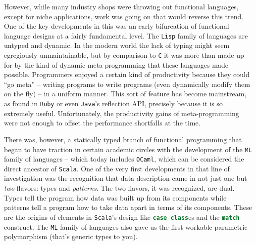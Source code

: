 However, while many industry shops were throwing out functional
languages, except for niche applications, work was going on that would
reverse this trend. One of the key developments in this was an early
bifurcation of functional language designs at a fairly fundamental
level. The \texttt{Lisp} family of languages are untyped and
dynamic. In the modern world the lack of typing might seem egregiously
unmaintainable, but by comparison to \texttt{C} it was more than made
up for by the kind of dynamic meta-programming that these languages
made possible. Programmers enjoyed a certain kind of productivity
because they could ``go meta'' -- writing programs to write programs
(even dynamically modify them on the fly) -- in a uniform manner. This
sort of feature has become mainstream, as found in \texttt{Ruby} or
even \texttt{Java}'s reflection API, precisely because it is so
extremely useful. Unfortunately, the productivity gains of
meta-programming were not enough to offset the performance shortfalls
at the time.

There was, however, a statically typed branch of functional
programming that began to have traction in certain academic circles
with the development of the \texttt{ML} family of languages -- which
today includes \texttt{OCaml}, which can be considered the direct
ancestor of \texttt{Scala}. One of the very first developments in that
line of investigation was the recognition that data description came
in not just one but \emph{two} flavors: types and \emph{patterns}. The
two flavors, it was recognized, are dual. Types tell the program how
data was built up from its components while patterns tell a program
how to take data apart in terms of its components. These are the
origins of elements in \texttt{Scala}'s design like
\lstinline[language=Scala]!case class!es and the
\lstinline[language=Scala]!match! construct. The \texttt{ML} family of
languages also gave us the first workable parametric polymorphism
(that's generic types to you). 

